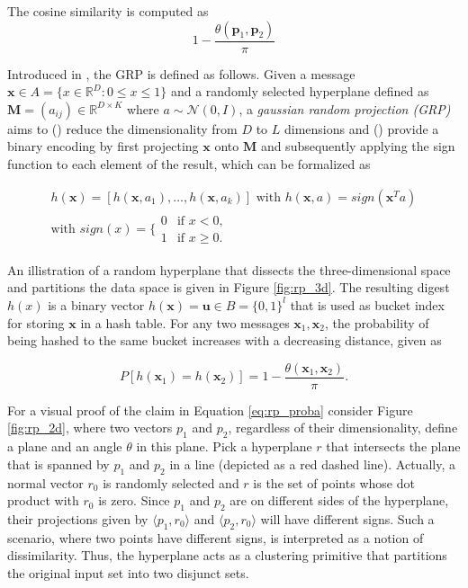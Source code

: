 \begin{definition}
    The cosine similarity is computed as
    \begin{equation}
        1- \frac{\theta(\bm{p}_1, \bm{p}_2)}{\pi}
    \end{equation}
\end{definition}

Introduced in \cite{charikar2002similarity}, the GRP is defined as follows. Given a message $\bm{x} \in A = \{x \in \mathbb{R}^D : 0 \leq x \leq 1 \}$ and a randomly selected hyperplane defined as $\bm{M}=(a_{ij}) \in \mathbb{R}^{D \times K}$ where $a \sim \mathcal{N}(0, I)$, a \textit{gaussian random projection (GRP)} aims to () reduce the dimensionality from $D$ to $L$ dimensions and () provide a binary encoding by first projecting $\bm{x}$ onto $\bm{M}$ and subsequently applying the sign function to each element of the result, which can be formalized as

\begin{gather}\label{eq:grp_sign}
    h(\bm{x}) = [h(\bm{x}, a_1), \dots, h(\bm{x}, a_k)] \text{ with } h(\bm{x}, a) = sign(\bm{x}^Ta) \\
    \text{with } sign(x) = \Biggl\{ \begin{array}{lc}
        0 & \text{if } x < 0, \\
        1 & \text{if } x \geq 0.
    \end{array}
\end{gather}

An illistration of a random hyperplane that dissects the three-dimensional space and partitions the data space is given in Figure \ref{fig:rp_3d}. The resulting digest $h(x)$ is a binary vector $h(\bm{x}) = \bm{u} \in B = \{0, 1\}^l$ that is used as bucket index for storing $\bm{x}$ in a hash table. For any two messages $\bm{x}_1, \bm{x}_2$, the probability of being hashed to the same bucket increases with a decreasing distance, given as

\begin{equation}\label{eq:rp_proba}
    P[h(\bm{x}_1) = h(\bm{x}_2)] = 1 - \frac{\theta(\bm{x}_1, \bm{x}_2)}{\pi}.
\end{equation}

For a visual proof of the claim in Equation \ref{eq:rp_proba} consider Figure \ref{fig:rp_2d}, where two vectors $p_1$ and $p_2$, regardless of their dimensionality, define a plane and an angle $\theta$ in this plane. Pick a hyperplane $r$ that intersects the plane that is spanned by $p_1$ and $p_2$ in a line (depicted as a red dashed line). Actually, a normal vector $r_0$ is randomly selected and $r$ is the set of points whose dot product with $r_0$ is zero. Since $p_1$ and $p_2$ are on different sides of the hyperplane, their projections given by $\langle p_1, r_0 \rangle$ and  $\langle p_2, r_0 \rangle$ will have different signs. Such a scenario, where two points have different signs, is interpreted as a notion of dissimilarity. Thus, the hyperplane acts as a clustering primitive that partitions the original input set into two disjunct sets.

